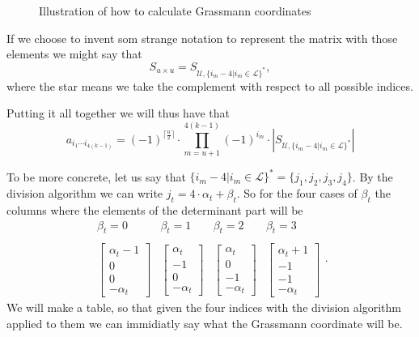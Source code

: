 \documentclass[a4paper,12pt]{book}
\theoremstyle{plain}
\theoremstyle{definition}
\begin{document}
\begin{figure}
{
}

\caption{Illustration of how to calculate Grassmann coordinates}

\end{figure}

If we choose to invent som strange notation to represent the matrix with those
elements we might say that
\[
	S_{u \times u} = S_{\mathcal{U}, \{i_m - 4 | i_m \in \mathcal{L}\}^*},
\]
where the star means we take the complement with respect to all possible indices.

Putting it all together we will thus have that
\[
	a_{i_1 \cdots i_{4(k-1)}} =
	(-1)^{\lceil \frac{u}{2} \rceil} \cdot \prod_{m = u + 1}^{4(k-1)} (-1)^{i_m} \cdot
	|S_{\mathcal{U}, \{i_m - 4 | i_m \in \mathcal{L}\}^*}|
\]

To be more concrete, let us say that \( \{i_m - 4 | i_m \in \mathcal{L}\}^* =
\{j_1, j_2, j_3, j_4\} \). By the division algorithm we can write
\( j_t = 4 \cdot \alpha_t + \beta_t \). So for the four cases of \( \beta_t \) the columns where the
elements of the determinant part will be
\[
	\begin{matrix}
		\beta_t = 0 & \beta_t = 1 & \beta_t = 2 & \beta_t = 3 \\
		& & & \\
		\begin{bmatrix}
			\alpha_t - 1 \\ 0 \\ 0 \\ -\alpha_t
		\end{bmatrix} & \begin{bmatrix}
			\alpha_t \\ -1 \\ 0 \\ -\alpha_t
		\end{bmatrix} & \begin{bmatrix}
			\alpha_t \\ 0 \\ -1 \\ -\alpha_t
		\end{bmatrix} & \begin{bmatrix}
			\alpha_t + 1 \\ -1 \\ -1 \\ -\alpha_t
		\end{bmatrix}
	\end{matrix}.
\]
We will make a table, so that given the four indices with the division algorithm applied to them
we can immidiatly say what the Grassmann coordinate will be.

\end{document}

